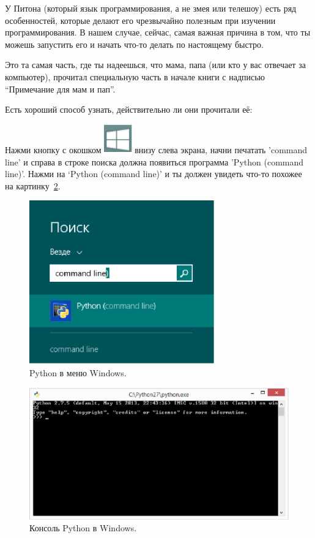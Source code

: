 У Питона (который язык программирования, а не змея или телешоу) есть ряд особенностей, которые делают его чрезвычайно полезным при изучении программирования. В нашем случае, сейчас, самая важная причина в том, что ты можешь запустить его и начать что-то делать по настоящему быстро.

Это та самая часть, где ты надеешься, что мама, папа (или кто у вас отвечает за компьютер), прочитал специальную часть в начале книги с надписью ``Примечание для мам и пап''.

\noindent
Есть хороший способ узнать, действительно ли они прочитали её:

\begin{WINDOWS}
Нажми кнопку с окошком \includegraphics*[width=12mm]{win-home.eps} внизу слева экрана, начни печатать 'command line' и справа в строке поиска должна появиться программа 'Python (command line)'. Нажми на `Python (command line)' и ты должен увидеть что-то похожее на картинку~\ref{fig2}.

\begin{figure}
\begin{center}
\includegraphics[width=80mm]{figure1.eps}
\end{center}
\caption{Python в меню Windows.}\label{fig1}
\end{figure}

\begin{figure}
\begin{center}
\includegraphics[width=135mm]{figure2.eps}
\end{center}
\caption{Консоль Python в Windows.}\label{fig2}
\end{figure}
\end{WINDOWS}

